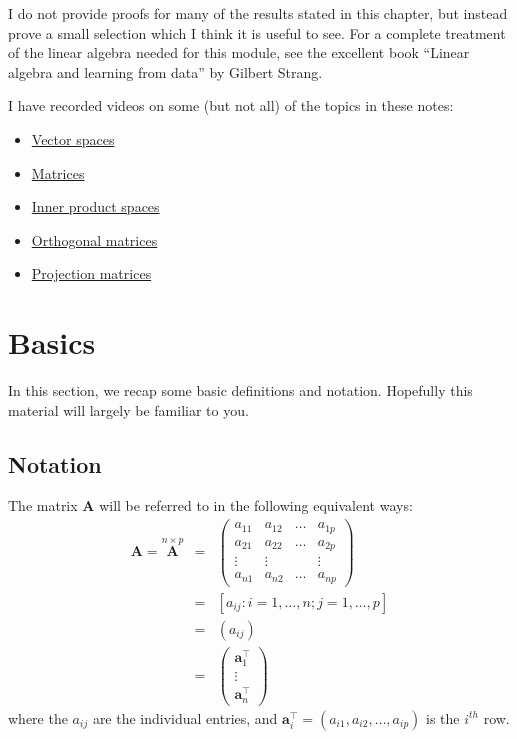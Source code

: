 \documentclass[
]{book}
\providecommand{\tightlist}{%
  \setlength{\itemsep}{0pt}\setlength{\parskip}{0pt}}
\theoremstyle{definition}
\theoremstyle{definition}
\theoremstyle{definition}
\theoremstyle{definition}
\theoremstyle{remark}
\begin{document}
I do not provide proofs for many of the results stated in this chapter, but instead prove a small selection which I think it is useful to see. For a complete treatment of the linear algebra needed for this module, see the excellent book ``Linear algebra and learning from data'' by Gilbert Strang.

I have recorded videos on some (but not all) of the topics in these notes:

\begin{itemize}
\tightlist
\item
  \href{https://mediaspace.nottingham.ac.uk/media/Vector+Spaces/1_48xqrp04}{Vector spaces}
\item
  \href{https://mediaspace.nottingham.ac.uk/media/Matrices/1_nqo2u7zs}{Matrices}
\item
  \href{https://mediaspace.nottingham.ac.uk/media/Inner+Product+Spaces/1_nhcbybg3}{Inner product spaces}
\item
  \href{https://mediaspace.nottingham.ac.uk/media/Orthogonal+Matrices/1_rr2ervcs}{Orthogonal matrices}
\item
  \href{https://mediaspace.nottingham.ac.uk/media/Projection/1_soh726fg}{Projection matrices}
\end{itemize}

\hypertarget{linalg-basics}{%
\section{Basics}\label{linalg-basics}}

In this section, we recap some basic definitions and notation. Hopefully this material will largely be familiar to you.

\hypertarget{notation-1}{%
\subsection{Notation}\label{notation-1}}

The matrix \({\mathbf A}\) will be referred to in the following equivalent ways:
\begin{eqnarray*}
{\mathbf A}=\stackrel{n\times p}{\mathbf A} &=& \left(\begin{array}{cccc}
a_{11}&a_{12}&\dots&a_{1p}\\
a_{21}&a_{22}&\dots&a_{2p}\\
\vdots&\vdots&&\vdots\\
a_{n1}&a_{n2}&\dots&a_{np}
\end{array} \right) \\
&=&[a_{ij}: i=1, \ldots , n; j=1, \ldots , p]\\
&=&(a_{ij})\\
&=& \left( \begin{array}{c}\mathbf a_1^\top\\
\vdots\\
\mathbf a_n^\top\end{array}\right)
\end{eqnarray*}
where the \(a_{ij}\) are the individual entries, and \(\mathbf a_i^\top=(a_{i1}, a_{i2}, \ldots, a_{ip})\) is the \(i^{th}\) row.
\end{document}
